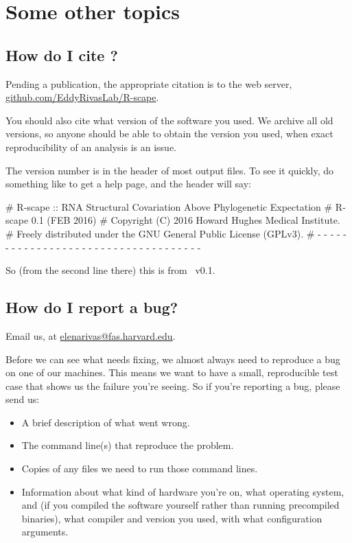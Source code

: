 
\section{Some other topics}
\label{section:more}
\setcounter{footnote}{0}

\subsection{How do I cite \rscape?}

Pending a publication, the appropriate citation is to the web server,
\url{github.com/EddyRivasLab/R-scape}.

You should also cite what version of the software you used. We archive
all old versions, so anyone should be able to obtain the version you
used, when exact reproducibility of an analysis is an issue.

The version number is in the header of most output files. To see it
quickly, do something like  to get a help page, and
the header will say:

\begin{sreoutput}
# R-scape :: RNA Structural Covariation Above Phylogenetic Expectation
# R-scape 0.1 (FEB 2016)
# Copyright (C) 2016 Howard Hughes Medical Institute.
# Freely distributed under the GNU General Public License (GPLv3).
# - - - - - - - - - - - - - - - - - - - - - - - - - - - - - - - - - - - -
\end{sreoutput}

So (from the second line there) this is from \rscape\ v0.1.

\subsection{How do I report a bug?}

Email us, at \url{elenarivas@fas.harvard.edu}.

Before we can see what needs fixing, we almost always need to
reproduce a bug on one of our machines. This means we want to have a
small, reproducible test case that shows us the failure you're seeing.
So if you're reporting a bug, please send us:

\begin{itemize}
 \item A brief description of what went wrong.
 \item The command line(s) that reproduce the problem.
 \item Copies of any files we need to run those command lines.
 \item Information about what kind of hardware you're on, what
   operating system, and (if you compiled the software yourself rather
   than running precompiled binaries), what compiler and version you
   used, with what configuration arguments.
\end{itemize}



